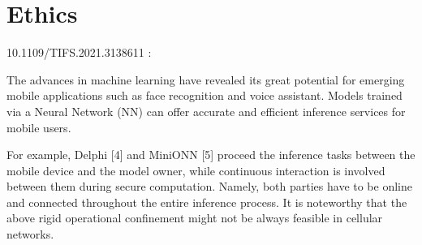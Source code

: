 \documentclass[../thesis.tex]{subfiles}
\begin{document}
\section{Ethics}
 10.1109/TIFS.2021.3138611 :
 
The advances in machine learning have revealed its
great potential for emerging mobile applications such as face
recognition and voice assistant. Models trained via a Neural
Network (NN) can offer accurate and efficient inference services for mobile users. 

For example, Delphi [4] and MiniONN [5] proceed the inference
tasks between the mobile device and the model owner, while
continuous interaction is involved between them during secure
computation. Namely, both parties have to be online and
connected throughout the entire inference process. It is noteworthy that the above rigid operational confinement might not
be always feasible in cellular networks. 
\end{document}
